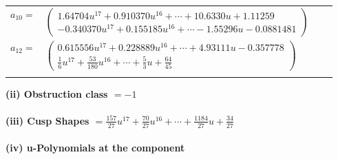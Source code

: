 \documentclass[1p]{elsarticle_modified}
\theoremstyle{definition}
\begin{document}
\begin{tabular}{m{7pt} m{180pt} m{7pt} m{180pt} }
\flushright $a_{10}=$&$\begin{pmatrix}1.64704 u^{17}+0.910370 u^{16}+\cdots+10.6330 u+1.11259\\-0.340370 u^{17}+0.155185 u^{16}+\cdots-1.55296 u-0.0881481\end{pmatrix}$ \\
\flushright $a_{12}=$&$\begin{pmatrix}0.615556 u^{17}+0.228889 u^{16}+\cdots+4.93111 u-0.357778\\\frac{1}{6} u^{17}+\frac{53}{180} u^{16}+\cdots+\frac{5}{3} u+\frac{64}{45}\end{pmatrix}$\\&\end{tabular}
\flushleft \textbf{(ii) Obstruction class $= -1$}\\~\\
\flushleft \textbf{(iii) Cusp Shapes $= \frac{157}{27} u^{17}+\frac{70}{27} u^{16}+\cdots+\frac{1184}{27} u+\frac{34}{27}$}\\~\\
\newpage\renewcommand{\arraystretch}{1}
\flushleft \textbf{(iv) u-Polynomials at the component}\newline \\
\end{document}
